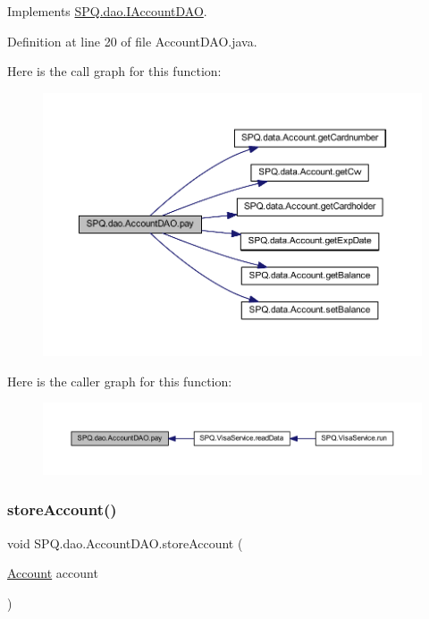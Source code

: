 Implements \mbox{\hyperlink{interface_s_p_q_1_1dao_1_1_i_account_d_a_o_aa1e3f13d419f23fc0cb5c98cd4cc5eb4}{S\+P\+Q.\+dao.\+I\+Account\+D\+AO}}.



Definition at line 20 of file Account\+D\+A\+O.\+java.

Here is the call graph for this function\+:\nopagebreak
\begin{figure}[H]
\begin{center}
\leavevmode
\includegraphics[width=350pt]{class_s_p_q_1_1dao_1_1_account_d_a_o_ad40cd6129f180d4cb235c00756b53930_cgraph}
\end{center}
\end{figure}
Here is the caller graph for this function\+:\nopagebreak
\begin{figure}[H]
\begin{center}
\leavevmode
\includegraphics[width=350pt]{class_s_p_q_1_1dao_1_1_account_d_a_o_ad40cd6129f180d4cb235c00756b53930_icgraph}
\end{center}
\end{figure}
\mbox{\label{class_s_p_q_1_1dao_1_1_account_d_a_o_abe750b9b11a2c7d398c4d8676b053f99}} 
\subsubsection{\texorpdfstring{store\+Account()}{storeAccount()}}
{\footnotesize\ttfamily void S\+P\+Q.\+dao.\+Account\+D\+A\+O.\+store\+Account (\begin{DoxyParamCaption}\item[{\mbox{\hyperlink{class_s_p_q_1_1data_1_1_account}{Account}}}]{account }\end{DoxyParamCaption})}



